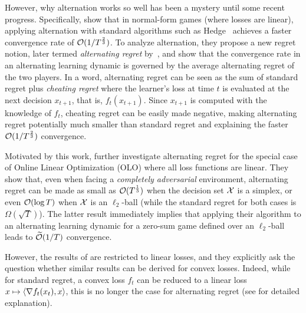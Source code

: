 However, why alternation works so well has been a mystery until some recent progress.
Specifically, \citet{wibisono2022alternating} show that in normal-form games (where losses are linear), applying alternation with standard algorithms such as Hedge~\citep{freund1997decision} achieves a faster convergence rate of $\mathcal{O}(1/T^{\frac{2}{3}})$.
To analyze alternation, they propose a new regret notion, later termed \textit{alternating regret} by~\citet{cevher2024alternation}, and show that the convergence rate in an alternating learning dynamic is governed by the average alternating regret of the two players. 
In a word, alternating regret can be seen as the sum of standard regret plus \textit{cheating regret} where the learner's loss at time $t$ is evaluated at the next decision $x_{t+1}$, that is, $f_t(x_{t+1})$.
Since $x_{t+1}$ is computed with the knowledge of $f_t$,
cheating regret can be easily made negative, making alternating regret potentially much smaller than standard regret and explaining the faster $\mathcal{O}(1/T^{\frac{2}{3}})$ convergence.

Motivated by this work, \citet{cevher2024alternation} further investigate alternating regret for the special case of Online Linear Optimization (OLO) where all loss functions are linear.
They show that, even when facing a \textit{completely adversarial} environment, alternating regret can be made as small as $\mathcal{O}(T^{\frac{1}{3}})$ when the decision set ${\mathcal{X}}$ is a simplex, or even $\mathcal{O}(\log T)$ when ${\mathcal{X}}$ is an $\ell_2$-ball (while the standard regret for both cases is $\Omega(\sqrt{T})$).
The latter result immediately implies that applying their algorithm to an alternating learning dynamic for a zero-sum game defined over an $\ell_2$-ball leads to $\widetilde{\mathcal{O}}(1/T)$ convergence.

However, the results of \citet{cevher2024alternation} are restricted to linear losses, and they explicitly ask the question whether similar results can be derived for convex losses.
Indeed, while for standard regret, a convex loss $f_t$ can be reduced to a linear loss $x\mapsto \left\langle {\nabla f_t(x_t), x} \right\rangle$, this is no longer the case for alternating regret (see  for detailed explanation).

